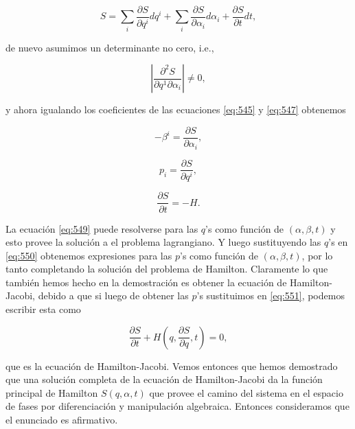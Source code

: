 \documentclass[a4paper,10pt]{article}
\numberwithin{equation}{section}
\begin{document}
\begin{equation}
 S = \sum_i \frac{\partial S}{\partial q^{i}}dq^{i} + 
 \sum_i \frac{\partial S}{\partial \alpha_i}d\alpha_i + 
 \frac{\partial S}{\partial t}dt,
 \label{eq:547}
\end{equation}

de nuevo asumimos un determinante no cero, i.e.,

\begin{equation}
 \left|\frac{\partial^2 S}{\partial q^{1}\partial \alpha_i} \right| 
 \ne 0,
\end{equation}

y ahora igualando los coeficientes de las ecuaciones \eqref{eq:545} y 
\eqref{eq:547} obtenemos 

\begin{equation}
 - \beta^i = \frac{\partial S}{\partial \alpha_i},
 \label{eq:549}
\end{equation}

\begin{equation}
 p_i = \frac{\partial S}{\partial q^i},
 \label{eq:550}
\end{equation}

\begin{equation}
 \frac{\partial S}{\partial t} = - H.
 \label{eq:551}
\end{equation}

La ecuación \eqref{eq:549} puede resolverse para las $q$'s como 
función de $(\alpha,\beta,t)$ y esto provee la solución a el 
problema lagrangiano. Y luego sustituyendo las $q$'s en \eqref{eq:550} 
obtenemos expresiones para las $p$'s como función de $(\alpha,\beta,t)$, 
por lo tanto completando la solución del problema de Hamilton. Claramente 
lo que también hemos hecho en la demostración es obtener la ecuación de 
Hamilton-Jacobi, debido a que si luego de obtener las $p$'s sustituimos 
en \eqref{eq:551}, podemos escribir esta como 

\begin{equation}
 \frac{\partial S}{\partial t} + H\left(q,\frac{\partial S}{\partial q}, 
 t \right) = 0,
\end{equation}

que es la ecuación de Hamilton-Jacobi. Vemos entonces que hemos demostrado 
que una solución completa de la ecuación de Hamilton-Jacobi da la función 
principal de Hamilton $S(q,\alpha,t)$ que provee el camino del sistema 
en el espacio de fases por diferenciación y manipulación algebraica. Entonces 
consideramos que el enunciado es afirmativo.
\end{document}
